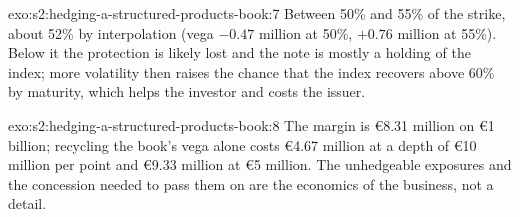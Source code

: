 \begin{solution}{exo:s2:hedging-a-structured-products-book:7}
Between 50\% and 55\% of the strike, about 52\% by interpolation (vega $-0.47$ million at 50\%, $+0.76$ million at 55\%). Below it the protection is
likely lost and the note is mostly a holding of the index; more volatility then raises the chance that the index recovers above 60\% by maturity,
which helps the investor and costs the issuer.
\end{solution}

\begin{solution}{exo:s2:hedging-a-structured-products-book:8}
The margin is \euro8.31 million on \euro1 billion; recycling the book's vega alone costs \euro4.67 million at a depth of \euro10 million per point and
\euro9.33 million at \euro5 million. The unhedgeable exposures and the concession needed to pass them on are the economics of the business, not a
detail.
\end{solution}

